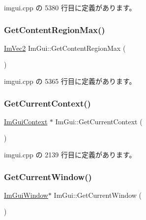  imgui.\+cpp の 5380 行目に定義があります。

\mbox{\label{namespace_im_gui_a0a4dbfabbfa45d74319ef541962ce2eb}} 
\subsubsection{\texorpdfstring{Get\+Content\+Region\+Max()}{GetContentRegionMax()}}
{\footnotesize\ttfamily \mbox{\hyperlink{struct_im_vec2}{Im\+Vec2}} Im\+Gui\+::\+Get\+Content\+Region\+Max (\begin{DoxyParamCaption}{ }\end{DoxyParamCaption})}



 imgui.\+cpp の 5365 行目に定義があります。

\mbox{\label{namespace_im_gui_af557a6de5538099a0f6047eb994bbf42}} 
\subsubsection{\texorpdfstring{Get\+Current\+Context()}{GetCurrentContext()}}
{\footnotesize\ttfamily \mbox{\hyperlink{struct_im_gui_context}{Im\+Gui\+Context}} $\ast$ Im\+Gui\+::\+Get\+Current\+Context (\begin{DoxyParamCaption}{ }\end{DoxyParamCaption})}



 imgui.\+cpp の 2139 行目に定義があります。

\mbox{\label{namespace_im_gui_a7ceba68eca2b09fb6bf1ad88037e6203}} 
\subsubsection{\texorpdfstring{Get\+Current\+Window()}{GetCurrentWindow()}}
{\footnotesize\ttfamily \mbox{\hyperlink{struct_im_gui_window}{Im\+Gui\+Window}}$\ast$ Im\+Gui\+::\+Get\+Current\+Window (\begin{DoxyParamCaption}{ }\end{DoxyParamCaption})\hspace{0.3cm}{\ttfamily [inline]}}



